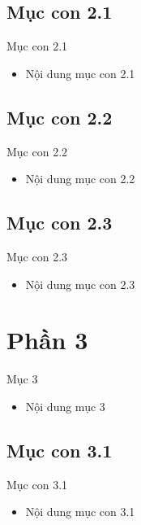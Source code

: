 \documentclass{beamer}
\begin{document}
\subsection{Mục con 2.1}
\begin{frame}{Mục con 2.1}
  \begin{itemize}
    \item Nội dung mục con 2.1
  \end{itemize}
\end{frame}

\subsection{Mục con 2.2}
\begin{frame}{Mục con 2.2}
  \begin{itemize}
    \item Nội dung mục con 2.2
  \end{itemize}
\end{frame}

\subsection{Mục con 2.3}
\begin{frame}{Mục con 2.3}
  \begin{itemize}
    \item Nội dung mục con 2.3
  \end{itemize}
\end{frame}

\section{Phần 3}
\begin{frame}{Mục 3}
  \begin{itemize}
    \item Nội dung mục 3
  \end{itemize}
\end{frame}

\subsection{Mục con 3.1}
\begin{frame}{Mục con 3.1}
  \begin{itemize}
    \item Nội dung mục con 3.1
  \end{itemize}
\end{frame}
\end{document}
